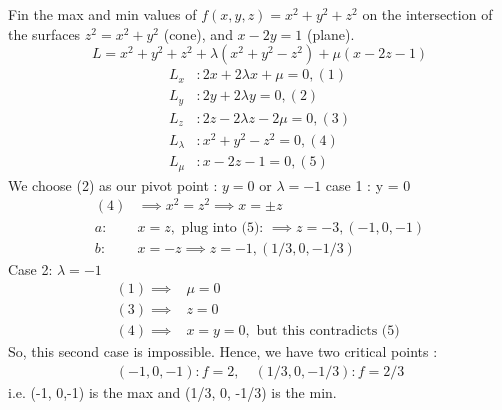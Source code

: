 \documentclass[12pt]{book}
\theoremstyle{definition}
\theoremstyle{remark}
\begin{document}
    \begin{example}Fin the max and min values of $f(x,y,z) = x^2+ y^2+ z^2$ on the intersection of the surfaces $z^2= x^2 + y^2 $ (cone), and $x-2y = 1$ (plane).  
      $$L = x^2 + y^2+ z^2+ \lambda (x^2 + y^2 - z^2) + \mu (x-2z - 1) $$
      \begin{equation*}
        \begin{split}
          L_x& : 2x + 2\lambda x + \mu = 0, (1)\\
          L_y& : 2y + 2 \lambda y = 0, (2) \\ 
          L_z& : 2 z - 2 \lambda z - 2 \mu = 0, (3) \\ 
          L_\lambda& : x^2 + y^2 - z^2 = 0, (4) \\ 
          L_\mu& : x - 2z -1 = 0, (5)   
        \end{split}
      \end{equation*}
      We choose (2) as our pivot point : $y = 0$ or $\lambda = -1$ 
      \newline case 1 : y = 0 
      \begin{equation*}
        \begin{split}
          (4)& \implies x^2 = z^2 \implies x = \pm z \\ 
          a:& x = z, \text{  plug into (5): } \implies z = -3, (-1,0,-1) \\ 
          b:& x = -z \implies z =-1 , (1/3,0,-1/3) 
        \end{split}
      \end{equation*}
      Case 2: $\lambda = -1$
      \begin{equation*}
        \begin{split}
          (1) \implies& \mu = 0 \\
          (3)\implies& z = 0 \\ 
          (4) \implies& x = y = 0, \text{ but this contradicts (5) }
        \end{split}
      \end{equation*}
      So, this second case is impossible. Hence, we have two critical points : 
      \begin{equation*}
        \begin{split}
          (-1,0,-1): f = 2, \quad (1/3, 0, -1/3): f= 2/3
        \end{split}
      \end{equation*}
      i.e. (-1, 0,-1) is the max and (1/3, 0, -1/3) is the min.
  \end{example}
\end{document}
